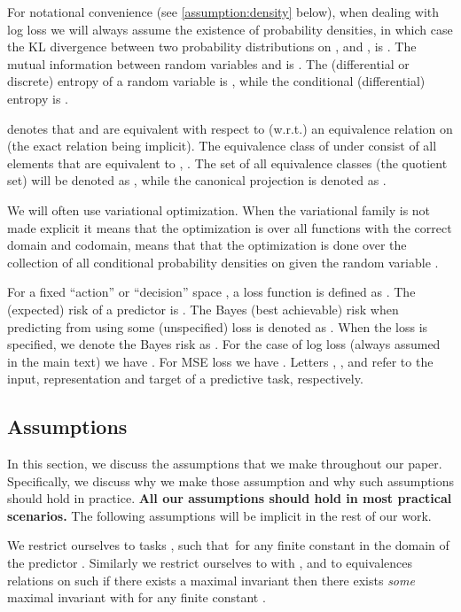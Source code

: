 \documentclass[final]{article}
\begin{document}
For notational convenience (see \cref{assumption:density}  below), when dealing with log loss we will always assume the existence of probability densities, in which case the KL divergence between two probability distributions on ,  and , is .
The mutual information between random variables  and  is .
The (differential or discrete) entropy of a random variable is , while the conditional (differential) entropy is .




 denotes that  and  are equivalent with respect to (w.r.t.) an equivalence relation on  (the exact relation being implicit).
The equivalence class of  under  consist of all elements that are equivalent to , \ie .
The set of all equivalence classes (the quotient set) will be denoted as , while the canonical projection is denoted as .

We will often use variational optimization. When the variational family is not made explicit it means that the optimization is over all functions with the correct domain and codomain, \eg   means that that the optimization is done over the collection of all conditional probability densities  on  given the random variable . 

For a fixed ``action'' or ``decision'' space , a loss function is defined as . The (expected) risk of a predictor  is . 
The Bayes (best achievable) risk when predicting  from  using some (unspecified) loss is denoted as . 
When the loss  is specified, we denote the Bayes risk as .
For the case of log loss (always assumed in the main text) we have  .
For MSE loss we have .
Letters , , and  refer to the input, representation and target of a predictive task, respectively.





\subsection{Assumptions}
\label{appx:assumptions}


In this section, we discuss the assumptions that we make throughout our paper. 
Specifically, we discuss why we make those assumption and why such assumptions should hold in practice.
\textbf{All our assumptions should hold in most practical scenarios.}
The following assumptions will be implicit in the rest of our work.



\begin{assumption}
\label{assumption:variance}
We restrict ourselves to tasks , such that\   for any finite constant  in the domain of the predictor .
Similarly we restrict ourselves to  with , and to equivalences relations on  such if there exists a maximal invariant then there exists \textit{some} maximal invariant  with  for any finite constant .
\end{assumption}
\end{document}
